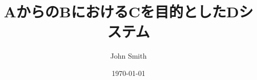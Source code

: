 ﻿\documentclass[12pt,a4paper,notitlepage,oneside,openany,report,fleqn]{jsbook}
\title{AからのBにおけるCを目的としたDシステム}
\author{John Smith}
\date{\today}
\begin{document}
\frontmatter
%
\dominitoc
\tableofcontents
%
\mainmatter









%
%
%
\end{document}
